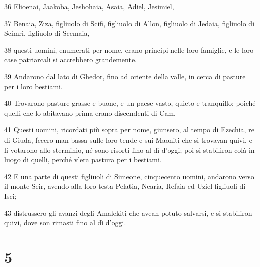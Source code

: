 \par 36 Elioenai, Jaakoba, Jeshohaia, Asaia, Adiel, Jesimiel,
\par 37 Benaia, Ziza, figliuolo di Scifi, figliuolo di Allon, figliuolo di Jedaia, figliuolo di Scimri, figliuolo di Scemaia,
\par 38 questi uomini, enumerati per nome, erano principi nelle loro famiglie, e le loro case patriarcali si accrebbero grandemente.
\par 39 Andarono dal lato di Ghedor, fino ad oriente della valle, in cerca di pasture per i loro bestiami.
\par 40 Trovarono pasture grasse e buone, e un paese vasto, quieto e tranquillo; poiché quelli che lo abitavano prima erano discendenti di Cam.
\par 41 Questi uomini, ricordati più sopra per nome, giunsero, al tempo di Ezechia, re di Giuda, fecero man bassa sulle loro tende e sui Maoniti che si trovavan quivi, e li votarono allo sterminio, né sono risorti fino al dì d'oggi; poi si stabiliron colà in luogo di quelli, perché v'era pastura per i bestiami.
\par 42 E una parte di questi figliuoli di Simeone, cinquecento uomini, andarono verso il monte Seir, avendo alla loro testa Pelatia, Nearia, Refaia ed Uziel figliuoli di Isci;
\par 43 distrussero gli avanzi degli Amalekiti che avean potuto salvarsi, e si stabiliron quivi, dove son rimasti fino al dì d'oggi.

\chapter{5}

